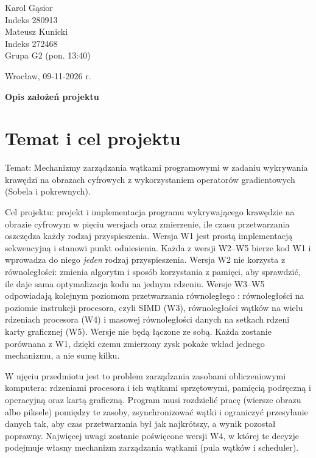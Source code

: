 \documentclass[12pt,a4paper]{article}
\begin{document}
\thispagestyle{empty}
\noindent
\begin{minipage}[t]{0.5\textwidth}
	Karol Gąsior\\
	Indeks 280913\\[0.6em]
	Mateusz Kunicki\\
	Indeks 272468\\[0.6em]
	Grupa G2 (pon. 13:40)
\end{minipage}%
\begin{minipage}[t]{0.5\textwidth}
	\raggedleft Wrocław, 09-11-2026 r.
\end{minipage}

\vspace{1.5em}
\begin{center}
	{\Large\bfseries Opis założeń projektu}
\end{center}
\vspace{0.5em}

\section{Temat i cel projektu}

Temat: Mechanizmy zarządzania wątkami programowymi w zadaniu wykrywania krawędzi na obrazach cyfrowych z wykorzystaniem operatorów gradientowych (Sobela i pokrewnych).

Cel projektu: projekt i implementacja programu wykrywającego krawędzie na obrazie cyfrowym w pięciu wersjach oraz zmierzenie, ile czasu przetwarzania oszczędza każdy rodzaj przyspieszenia. Wersja W1 jest prostą implementacją sekwencyjną i stanowi punkt odniesienia. Każda z wersji W2--W5 bierze kod W1 i wprowadza do niego \emph{jeden} rodzaj przyspieszenia. Wersja W2 nie korzysta z równoległości: zmienia algorytm i sposób korzystania z pamięci, aby sprawdzić, ile daje sama optymalizacja kodu na jednym rdzeniu. Wersje W3--W5 odpowiadają kolejnym poziomom przetwarzania równoległego \cite{czech}: równoległości na poziomie instrukcji procesora, czyli SIMD (W3), równoległości wątków na wielu rdzeniach procesora (W4) i masowej równoległości danych na setkach rdzeni karty graficznej (W5). Wersje nie będą łączone ze sobą. Każda zostanie porównana z W1, dzięki czemu zmierzony zysk pokaże wkład jednego mechanizmu, a nie sumę kilku.

W ujęciu przedmiotu jest to problem zarządzania zasobami obliczeniowymi komputera: rdzeniami procesora i ich wątkami sprzętowymi, pamięcią podręczną i operacyjną oraz kartą graficzną. Program musi rozdzielić pracę (wiersze obrazu albo piksele) pomiędzy te zasoby, zsynchronizować wątki i ograniczyć przesyłanie danych tak, aby czas przetwarzania był jak najkrótszy, a wynik pozostał poprawny. Najwięcej uwagi zostanie poświęcone wersji W4, w której te decyzje podejmuje własny mechanizm zarządzania wątkami (pula wątków i scheduler).
\end{document}

